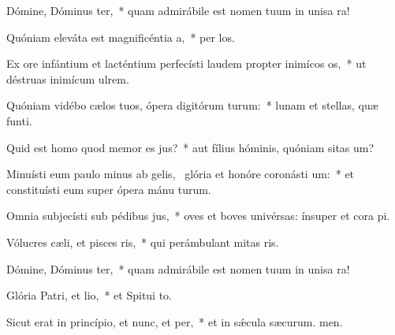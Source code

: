 \item Dómine, Dóminus ter,~* quam admirábile est nomen tuum in unisa ra!
\item Quóniam eleváta est magnificéntia a,~* per los.
\item Ex ore infántium et lacténtium perfecísti laudem propter inimícos os,~* ut déstruas inimícum  ulrem.
\item Quóniam vidébo cælos tuos, ópera digitórum turum:~* lunam et stellas, quæ  funti.
\item Quid est homo quod memor es jus?~* aut fílius hóminis, quóniam sitas um?
\item Minuísti eum paulo minus ab gelis,~\pscross{} glória et honóre coronásti um:~* et constituísti eum super ópera mánu turum.
\item Omnia subjecísti sub pédibus jus,~* oves et boves univérsas: ínsuper et cora pi.
\item Vólucres cæli, et pisces ris,~* qui perámbulant mitas ris.
\item Dómine, Dóminus ter,~* quam admirábile est nomen tuum in unisa ra!
\item Glória Patri, et lio,~* et Spitui to.
\item Sicut erat in princípio, et nunc, et per,~* et in sǽcula sæcurum. men.
